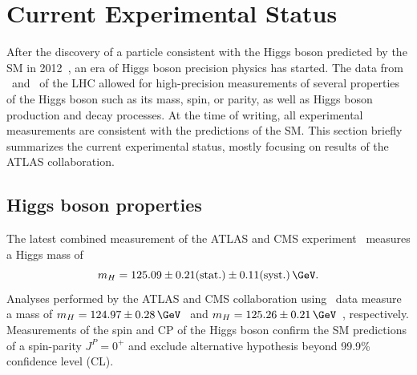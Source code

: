 



\section{Current Experimental Status}
\label{subsec:higgs-exp-status}
After the discovery of a particle consistent with the Higgs boson predicted by the SM in 2012~\cite{HIGG-2012-27,CMS-HIG-12-028}, an era of Higgs boson precision physics has started.
The data from \RunOne\ and \RunTwo\ of the LHC allowed for high-precision measurements of several properties of the Higgs boson such as its mass, spin, or parity, as well as Higgs boson production and decay processes. 
At the time of writing, all experimental measurements are consistent with the predictions of the SM.
This section briefly summarizes the current experimental status, mostly focusing on results of the ATLAS collaboration.

\subsection{Higgs boson properties}
The latest combined measurement of the ATLAS and CMS experiment~\cite{HIGG-2014-14} measures a Higgs mass of 
\begin{equation}
  m_H = 125.09 \pm 0.21\text{(stat.)} \pm 0.11\text{(syst.)}\,\GeV.
\end{equation}
Analyses performed by the ATLAS and CMS collaboration using \RunTwo\ data measure a mass of $m_H = 124.97\pm0.28\,\GeV$~\cite{ATLAS-CONF-2017-046} and $m_H = 125.26 \pm 0.21\,\GeV$~\cite{Sirunyan_2020}, respectively.
Measurements of the spin and CP of the Higgs boson confirm the SM predictions of a spin-parity $J^P = 0^+$ and exclude alternative hypothesis beyond 99.9\% confidence level (CL).~\cite{HIGG-2013-17-witherratum,CMS-HIG-14-018} 

